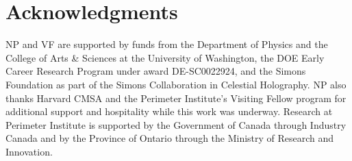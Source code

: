 \documentclass[../main.tex]{subfiles}
\begin{document}
%
%
%
%

\section{Acknowledgments}

NP and VF are supported by funds from the Department of Physics and the College of Arts \& Sciences at the University of Washington, the DOE Early Career Research Program under award DE-SC0022924, and the Simons Foundation as part of the Simons Collaboration in Celestial Holography. NP also thanks Harvard CMSA and the Perimeter Institute's Visiting Fellow program for additional support and hospitality while this work was underway. Research at Perimeter Institute is supported by the Government of Canada through Industry Canada and by the Province of Ontario through the Ministry of Research and Innovation.
\end{document}
